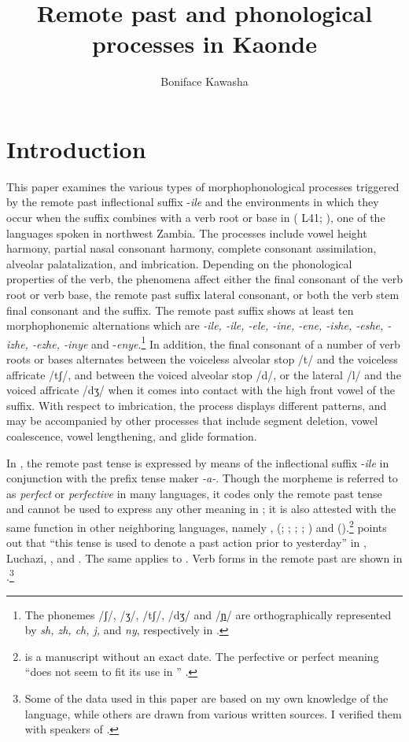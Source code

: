 \documentclass[output=paper]{langsci/langscibook}
\title{Remote past and phonological processes in Kaonde}
\author{%
Boniface Kawasha\affiliation{Savannah State University}
}
\begin{document}

\section{Introduction}\label{§1:introduction.kawasha}

This paper examines the various types of morphophonological processes triggered by the remote past inflectional suffix -\textit{ile} and the environments in which they occur when the suffix combines with a verb root or base in  ( L41; \citealt{guthrie1967}), one of the languages spoken in northwest Zambia. The processes include vowel height harmony, partial nasal consonant harmony, complete consonant assimilation, alveolar palatalization, and imbrication. Depending on the phonological properties of the verb, the phenomena affect either the final consonant of the verb root or verb base, the remote past suffix lateral consonant, or both the verb stem final consonant and the suffix. The remote past suffix shows at least ten morphophonemic alternations which are \textit{-ile, -ile, -ele, -ine, -ene, -ishe, -eshe, -izhe, -ezhe, -inye} and -\textit{enye}.\footnote{The phonemes /ʃ/, /ʒ/, /tʃ/, /dʒ/ and /\href{http://en.wikipedia.org/wiki/Ɲ}{ɲ}/ are orthographically represented by \textit{sh, zh, ch, j,} and \textit{ny}, respectively in .} In addition, the final consonant of a number of verb roots or bases alternates between the voiceless alveolar stop /t/ and the voiceless affricate /tʃ/, and between the voiced alveolar stop /d/, or the lateral /l/ and the voiced affricate /dʒ/ when it comes into contact with the high front vowel of the suffix. With respect to imbrication, the process displays different patterns, and may be accompanied by other processes that include segment deletion, vowel coalescence, vowel lengthening, and glide formation.

In , the remote past tense is expressed by means of the inflectional suffix -\textit{ile} in conjunction with the prefix tense maker \textit{-a-}. Though the morpheme is referred to as \textit{perfect} or \textit{perfective} in many  languages, it codes only the remote past tense and cannot be used to express any other meaning in  \citep[137]{wright1977}; it is also attested with the same function in other neighboring languages, namely ,  (\citealt{white1947}; \citeyear{white1949}; \citeyear{white196x}; \citealt{horton1949}; \citealt{yukawa1987}) and  (\citealt{fisher1984,kawasha2003}).\footnote{\citep{white196x} is a manuscript without an exact date. The perfective or perfect meaning “does not seem to fit its use in ” \citep{wright1977}.} \citet[6]{white1947} points out that “this tense is used to denote a past action prior to yesterday” in , Luchazi, , and . The same applies to . Verb forms in the remote past are shown in .\footnote{Some of the data used in this paper are based on my own knowledge of the language, while others are drawn from various written sources. I verified them with speakers of .}
\end{document}
